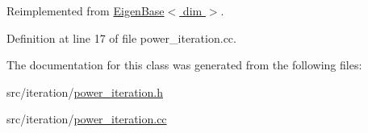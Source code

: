 Reimplemented from \hyperlink{class_eigen_base_ae09830ed4bcb14b7b699cd5f5460fab7}{Eigen\+Base$<$ dim $>$}.



Definition at line 17 of file power\+\_\+iteration.\+cc.



The documentation for this class was generated from the following files\+:\begin{DoxyCompactItemize}
\item 
src/iteration/\hyperlink{power__iteration_8h}{power\+\_\+iteration.\+h}\item 
src/iteration/\hyperlink{power__iteration_8cc}{power\+\_\+iteration.\+cc}\end{DoxyCompactItemize}

